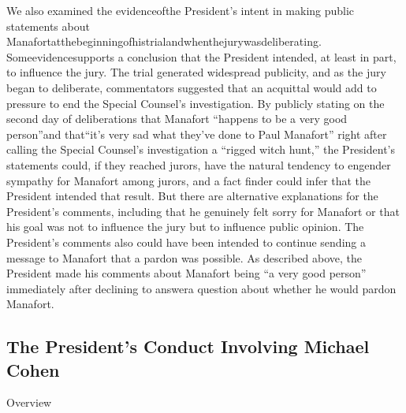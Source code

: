 We also examined the evidenceofthe President's intent in making public statements about Manafortatthebeginningofhistrialandwhenthejurywasdeliberating. Someevidencesupports a conclusion that the President intended, at least in part, to influence the jury.
The trial generated widespread publicity, and as the jury began to deliberate, commentators suggested that an acquittal would add to pressure to end the Special Counsel's investigation.
By publicly stating on the second day of deliberations that Manafort “happens to be a very good person”and that“it's very sad what they've done to Paul Manafort” right after calling the Special Counsel's investigation a “rigged witch hunt,” the President's statements could, if they reached jurors, have the natural tendency to engender sympathy for Manafort among jurors, and a fact finder could infer that the President intended that result.
But there are alternative explanations for the President's comments, including that he genuinely felt sorry for Manafort or that his goal was not to influence the jury but to influence public opinion.
The President's comments also could have been intended to continue sending a message to Manafort that a pardon was possible.
As described above, the President made his comments about Manafort being “a very good person” immediately after declining to answera question about whether he would pardon Manafort.


\subsection{The President's Conduct Involving Michael Cohen}

Overview

